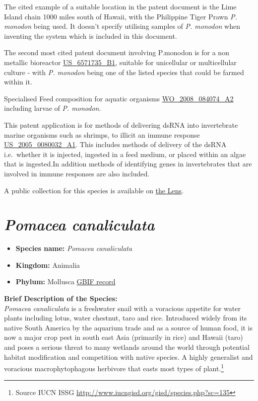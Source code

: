 \documentclass[]{book}
\providecommand{\tightlist}{%
  \setlength{\itemsep}{0pt}\setlength{\parskip}{0pt}}
\let\rmarkdownfootnote\footnote%
\def\footnote{\protect\rmarkdownfootnote}
\theoremstyle{definition}
\theoremstyle{definition}
\theoremstyle{definition}
\theoremstyle{remark}
\begin{document}
The cited example of a suitable location in the patent document is the
Lime Island chain 1000 miles south of Hawaii, with the Philippine Tiger
Prawn \emph{P. monodon} being used. It doesn't specify utilising samples
of \emph{P. monodon} when inventing the system which is included in this
document.

The second most cited patent document involving P.monodon is for a non
metallic bioreactor
\href{https://www.lens.org/lens/patent/US_6571735_B1}{US\_6571735\_B1},
suitable for unicellular or multicellular culture - with \emph{P.
monodon} being one of the listed species that could be farmed within it.

Specialised Feed composition for aquatic organisms
\href{https://www.lens.org/lens/patent/WO_2008_084074_A2}{WO\_2008\_084074\_A2}
including larvae of \emph{P. monodon}.

This patent application is for methods of delivering dsRNA into
invertebrate marine organisms such as shrimps, to illicit an immune
response
\href{https://www.lens.org/lens/patent/US_2005_0080032_A1}{US\_2005\_0080032\_A1}.
This includes methods of delivery of the dsRNA i.e.~whether it is
injected, ingested in a feed medium, or placed within an algae that is
ingested.In addition methods of identifying genes in invertebrates that
are involved in immune responses are also included.

A public collection for this species is available on
\href{https://www.lens.org/lens/collection/24679}{the Lens}.

\hypertarget{pomacea-canaliculata}{%
\section{\texorpdfstring{\emph{Pomacea
canaliculata}}{Pomacea canaliculata}}\label{pomacea-canaliculata}}

\begin{itemize}
\tightlist
\item
  \textbf{Species name:} \emph{Pomacea canaliculata}
\item
  \textbf{Kingdom:} Animalia
\item
  \textbf{Phylum:} Mollusca
  \href{https://www.gbif.org/species/2292582}{GBIF record}
\end{itemize}

\textbf{Brief Description of the Species:}\\
\emph{Pomacea canaliculata} is a freshwater snail with a voracious
appetite for water plants including lotus, water chestnut, taro and
rice. Introduced widely from its native South America by the aquarium
trade and as a source of human food, it is now a major crop pest in
south east Asia (primarily in rice) and Hawaii (taro) and poses a
serious threat to many wetlands around the world through potential
habitat modification and competition with native species. A highly
generalist and voracious macrophytophagous herbivore that easts most
types of plant.\footnote{Source IUCN ISSG
  \url{http://www.iucngisd.org/gisd/species.php?sc=135}}
\end{document}
